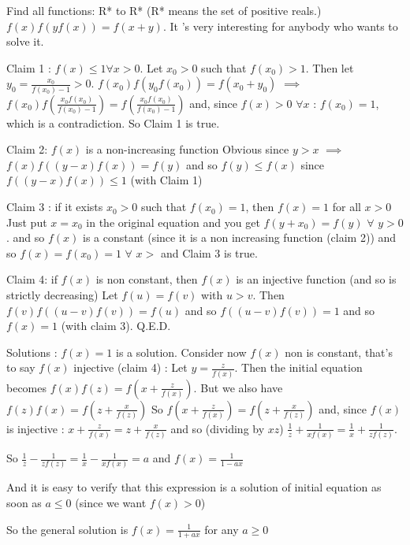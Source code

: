 \begin{mysolution}
$ $\newline
\begin{tcolorbox}Find all functions: R* to R* (R* means the set of positive reals.)
$ f(x)f(yf(x))=f(x+y)$.
It 's very interesting for anybody who wants to solve it. 
\end{tcolorbox}

Claim 1 : $ f(x)\leq 1 \forall  x>0$. 
Let $ x_{0}>0$ such that $ f(x_{0})>1$. Then let $ y_{0}=\frac{x_{0}}{f(x_{0})-1}>0$.
$ f(x_{0})f(y_{0}f(x_{0}))=f(x_{0}+y_{0})$ $ \implies$ $ f(x_{0}) f(\frac{x_{0}f(x_{0})}{f(x_{0})-1}) = f(\frac{x_{0}f(x_{0})}{f(x_{0})-1})$ and, since $ f(x)>0$ $ \forall x$ : $ f(x_{0})=1$, which is a contradiction. So Claim 1 is true.

Claim 2: $ f(x)$ is a non-increasing function
Obvious since $ y>x$ $ \implies$ $ f(x) f((y-x)f(x))=f(y)$ and so $ f(y)\leq f(x)$ since $ f((y-x)f(x))\leq 1$ (with Claim 1)

Claim 3 : if it exists $x_0>0$ such that $ f(x_0)=1$, then $ f(x)=1$ for all $ x>0$
Just put $ x=x_{0}$ in the original equation and you get $ f(y+x_{0})=f(y)$ $ \forall$ $ y>0$. and so $ f(x)$ is a constant (since it is a non increasing function (claim 2)) and so $ f(x)=f(x_{0})=1$ $ \forall$ $ x>$ and Claim 3 is true.

Claim 4: if $ f(x)$ is non constant, then $ f(x)$ is an injective function (and so is strictly decreasing)
Let $ f(u)=f(v)$ with $ u>v$. Then $ f(v) f((u-v)f(v))=f(u)$ and so $ f((u-v)f(v))=1$ and so $ f(x)=1$ (with claim 3). Q.E.D.

Solutions :
$ f(x)=1$ is a solution.
Consider now $ f(x)$ non is constant, that's to say $ f(x)$ injective (claim 4) :
Let $ y=\frac{z}{f(x)}$. Then the initial equation becomes $ f(x)f(z)=f(x+\frac{z}{f(x)})$.
But we also have $ f(z)f(x)=f(z+\frac{x}{f(z)})$
So  $ f(x+\frac{z}{f(x)})=f(z+\frac{x}{f(z)})$ and, since $ f(x)$ is injective : $ x+\frac{z}{f(x)}=z+\frac{x}{f(z)}$ and so (dividing by $ xz$) $ \frac{1}{z}+\frac{1}{xf(x)}=\frac{1}{x}+\frac{1}{zf(z)}$.

So $ \frac{1}{z}-\frac{1}{zf(z)}=\frac{1}{x}-\frac{1}{xf(x)}=a$ and $ f(x)=\frac{1}{1-ax}$

And it is easy to verify that this expression is a solution of initial equation as soon as $ a\leq 0$ (since we want $ f(x)>0$)

So the general solution is $ f(x)=\frac{1}{1+ax}$ for any $ a\geq 0$
\end{mysolution}



